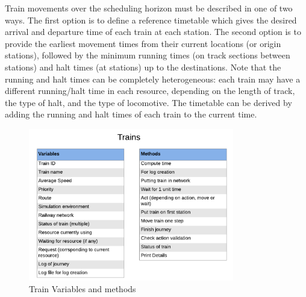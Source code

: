 \vspace{0.25cm}
Train movements over the scheduling horizon must be described in one of two ways. The first option is
to define a reference timetable which gives the desired arrival
and departure time of each train at each station. The second
option is to provide the earliest movement times from their
current locations (or origin stations), followed by the minimum
running times (on track sections between stations) and halt
times (at stations) up to the destinations. Note that the running
and halt times can be completely heterogeneous: each train
may have a different running/halt time in each resource,
depending on the length of track, the type of halt, and the
type of locomotive. The timetable can be derived by adding
the running and halt times of each train to the current time.

\begin{figure}[h]
    \centering
    \includegraphics[width=0.8\textwidth]{train}
    \caption{ Train Variables and methods }
    \label{image-myimage3}
\end{figure}

